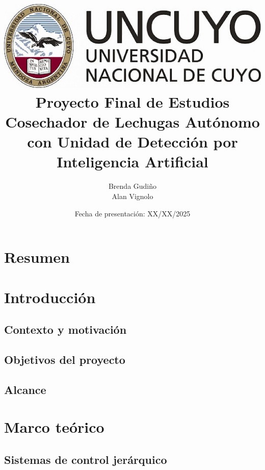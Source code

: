 \documentclass[a4paper,12pt]{report}
\title{
\includegraphics[scale = 0.3]{logo_uncuyo.png} \\ [2cm]
{\Huge \textbf{Proyecto Final de Estudios} \\ [1cm] 
Cosechador de Lechugas Autónomo con Unidad de Detección por Inteligencia Artificial}}
\author{Brenda Gudiño \\ Alan Vignolo}
\date{{Fecha de presentación: XX/XX/2025}}
\begin{document}

\maketitle
\setcounter{tocdepth}{1}  %
\tableofcontents
\newpage

\chapter*{Resumen}


\chapter{Introducción}

\section{Contexto y motivación}

\newpage
\section{Objetivos del proyecto}


\section{Alcance}


\chapter{Marco teórico}

\section{Sistemas de control jerárquico}

\end{document}

